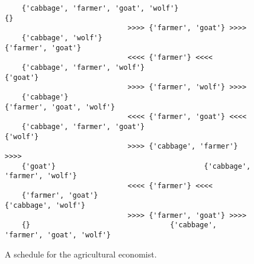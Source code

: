 \begin{figure}[!ht]
  \centering
\begin{verbatim}
    {'cabbage', 'farmer', 'goat', 'wolf'}                                 {}
                             >>>> {'farmer', 'goat'} >>>> 
    {'cabbage', 'wolf'}                                   {'farmer', 'goat'}
                             <<<< {'farmer'} <<<< 
    {'cabbage', 'farmer', 'wolf'}                                   {'goat'}
                             >>>> {'farmer', 'wolf'} >>>> 
    {'cabbage'}                                   {'farmer', 'goat', 'wolf'}
                             <<<< {'farmer', 'goat'} <<<< 
    {'cabbage', 'farmer', 'goat'}                                   {'wolf'}
                             >>>> {'cabbage', 'farmer'} >>>> 
    {'goat'}                                   {'cabbage', 'farmer', 'wolf'}
                             <<<< {'farmer'} <<<< 
    {'farmer', 'goat'}                                   {'cabbage', 'wolf'}
                             >>>> {'farmer', 'goat'} >>>> 
    {}                                 {'cabbage', 'farmer', 'goat', 'wolf'}
\end{verbatim} 
\vspace*{-0.3cm}
\caption{A schedule for the agricultural economist.}  
\label{fig:wolf-ziege-solution}
\end{figure}
\pagebreak
\vspace*{\fill}



